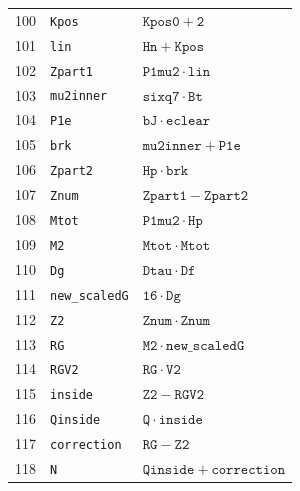 \begin{longtable}{rll}
100 & \texttt{Kpos} & $\mathtt{Kpos0} + \mathtt{2}$ \\
101 & \texttt{lin} & $\mathtt{Hn} + \mathtt{Kpos}$ \\
102 & \texttt{Zpart1} & $\mathtt{P1mu2} \mathbin{\cdot} \mathtt{lin}$ \\
103 & \texttt{mu2inner} & $\mathtt{sixq7} \mathbin{\cdot} \mathtt{Bt}$ \\
104 & \texttt{P1e} & $\mathtt{bJ} \mathbin{\cdot} \mathtt{eclear}$ \\
105 & \texttt{brk} & $\mathtt{mu2inner} + \mathtt{P1e}$ \\
106 & \texttt{Zpart2} & $\mathtt{Hp} \mathbin{\cdot} \mathtt{brk}$ \\
107 & \texttt{Znum} & $\mathtt{Zpart1} - \mathtt{Zpart2}$ \\
108 & \texttt{Mtot} & $\mathtt{P1mu2} \mathbin{\cdot} \mathtt{Hp}$ \\
109 & \texttt{M2} & $\mathtt{Mtot} \mathbin{\cdot} \mathtt{Mtot}$ \\
110 & \texttt{Dg} & $\mathtt{Dtau} \mathbin{\cdot} \mathtt{Df}$ \\
111 & \texttt{new\_scaledG} & $\mathtt{16} \mathbin{\cdot} \mathtt{Dg}$ \\
112 & \texttt{Z2} & $\mathtt{Znum} \mathbin{\cdot} \mathtt{Znum}$ \\
113 & \texttt{RG} & $\mathtt{M2} \mathbin{\cdot} \mathtt{new\_scaledG}$ \\
114 & \texttt{RGV2} & $\mathtt{RG} \mathbin{\cdot} \mathtt{V2}$ \\
115 & \texttt{inside} & $\mathtt{Z2} - \mathtt{RGV2}$ \\
116 & \texttt{Qinside} & $\mathtt{Q} \mathbin{\cdot} \mathtt{inside}$ \\
117 & \texttt{correction} & $\mathtt{RG} - \mathtt{Z2}$ \\
118 & \texttt{N} & $\mathtt{Qinside} + \mathtt{correction}$ \\
\bottomrule\end{longtable}
\endgroup
